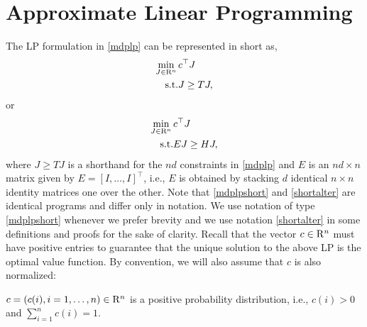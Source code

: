 \section{Approximate Linear Programming}
The LP formulation in \eqref{mdplp} can be represented in short as,
\begin{align}
\begin{split}
\label{mdplpshort}
\min_{J\in \R^n}\, &c^\top J\\
\text{s.t.}\mb &J\geq T J,
\end{split}
\end{align}
or 
\begin{align}
\begin{split}
\label{shortalter}
\min_{J\in \R^n} \,&c^\top J\\
\text{s.t.}\mb &EJ\geq H J,
\end{split}
\end{align}
where $J\geq TJ$ is a shorthand for the $nd$ constraints in \eqref{mdplp} and $E$ is an $nd\times n$ matrix given by $E=[I,\ldots,I]^\top$, i.e., $E$ is obtained by stacking $d$ identical $n\times n$ identity matrices one over the other. Note that \eqref{mdplpshort} and \eqref{shortalter} are identical programs and differ only in notation. We use notation of type \eqref{mdplpshort} whenever we prefer brevity and we use notation \eqref{shortalter} in some definitions and proofs for the sake of clarity.
Recall that the vector $c\in \mathrm{R}^n$ must have positive entries to guarantee that the unique solution to the above LP is the optimal value function. By convention, we will also assume that $c$ is also normalized:
\begin{assumption}\label{probdist}
$c=(c(i),i=1,\ldots,n)\in \mathrm{R}^n$ is a positive probability distribution, i.e., $c(i)>0$ and $\sum_{i=1}^n c(i)=1$.
\end{assumption}

